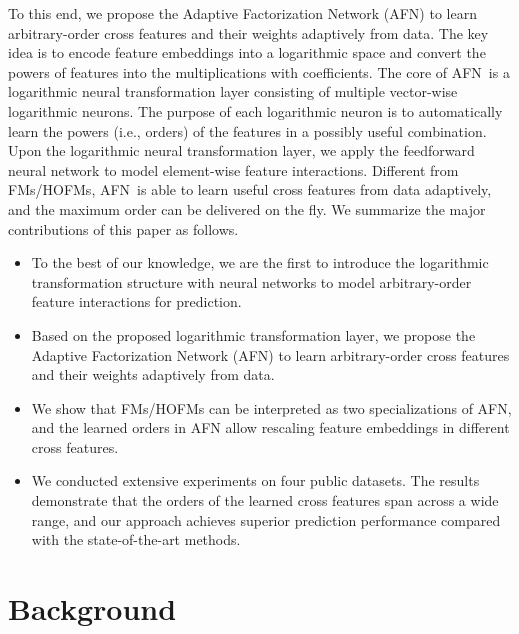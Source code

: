 \documentclass[letterpaper]{article} \usepackage{aaai20}  \usepackage{times}  \usepackage{helvet} \usepackage{courier}  \usepackage[hyphens]{url}  \usepackage{graphicx} \urlstyle{rm} \def\UrlFont{\rm}  \usepackage{graphicx}  \frenchspacing  \setlength{\pdfpagewidth}{8.5in}  \setlength{\pdfpageheight}{11in}
\newcommand{\model}{{AFN}~}
\newcommand{\modelns}{{AFN}}
\begin{document}
To this end, we propose the Adaptive Factorization Network (\modelns) to learn arbitrary-order cross features and their weights adaptively from data. The key idea is to encode feature embeddings into a logarithmic space and convert the powers of features into the multiplications with coefficients. 
The core of \model is a logarithmic neural transformation layer consisting of multiple vector-wise logarithmic neurons. The purpose of each logarithmic neuron is to automatically learn the powers (i.e., orders) of the features in a possibly useful combination. 
Upon the logarithmic neural transformation layer, we apply the feedforward neural network to model element-wise feature interactions.
Different from FMs/HOFMs, \model is able to learn useful cross features from data adaptively, and the maximum order can be delivered on the fly. 
We summarize the major contributions of this paper as follows. 
\begin{itemize}
\item To the best of our knowledge, we are the first to introduce the logarithmic transformation structure with neural networks to model arbitrary-order feature interactions for prediction.
\item Based on the proposed logarithmic transformation layer, we propose the Adaptive Factorization Network (\modelns) to learn arbitrary-order cross features and their weights adaptively from data.
\item We show that FMs/HOFMs can be interpreted as two specializations of AFN, and the learned orders in AFN allow rescaling feature embeddings in different cross features.
\item We conducted extensive experiments on four public datasets. The results demonstrate that the orders of the learned cross features span across a wide range, and our approach achieves superior prediction performance compared with the state-of-the-art methods.
\end{itemize}


\section{Background}
\label{sec:background}
\end{document}
